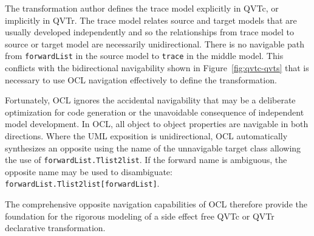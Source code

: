 \documentclass{llncs}
\begin{document}
The transformation author defines the trace model explicitly in QVTc, or implicitly in QVTr. The trace model relates source and target models that are usually developed independently and so the relationships from trace model to source or target model are necessarily unidirectional. There is  no navigable path from \texttt{forwardList} in the source model to \texttt{trace} in the middle model. This conflicts with the bidirectional navigability shown in Figure~\ref{fig:qvtc-qvts} that is necessary to use OCL navigation effectively to define the transformation.

Fortunately, OCL ignores the accidental navigability that may be a deliberate optimization for code generation or the unavoidable consequence of independent model development. In OCL, all object to object properties are navigable in both directions. Where the UML exposition is unidirectional, OCL automatically synthesizes an opposite using the name of the unnavigable target class allowing the use of \texttt{forwardList.Tlist2list}. If the forward name is ambiguous, the opposite name may be used to disambiguate: \texttt{forwardList.Tlist2list[forwardList]}.

The comprehensive opposite navigation capabilities of OCL therefore provide the foundation for the rigorous modeling of a side effect free QVTc or QVTr declarative transformation.
\end{document}
